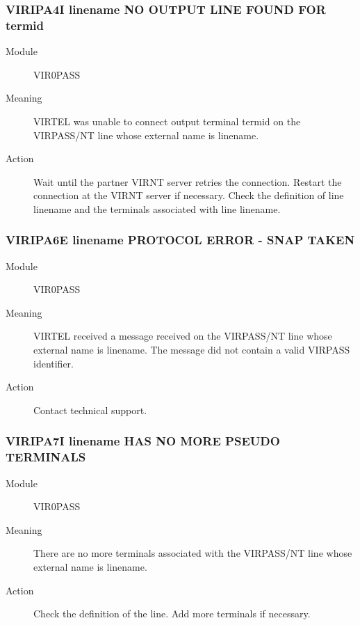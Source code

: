 \documentclass[letterpaper,10pt,english]{sphinxmanual}
\begin{document}
\subsubsection{VIRIPA4I linename NO OUTPUT LINE FOUND FOR termid}
\label{\detokenize{messages:viripa4i-linename-no-output-line-found-for-termid}}\begin{description}
\item[{Module}] \leavevmode
VIR0PASS

\item[{Meaning}] \leavevmode
VIRTEL was unable to connect output terminal termid on the VIRPASS/NT line whose external name is linename.

\item[{Action}] \leavevmode
Wait until the partner VIRNT server retries the connection. Restart the connection at the VIRNT server if necessary. Check the definition of line linename and the terminals associated with line linename.

\end{description}


\subsubsection{VIRIPA6E linename PROTOCOL ERROR - SNAP TAKEN}
\label{\detokenize{messages:viripa6e-linename-protocol-error-snap-taken}}\begin{description}
\item[{Module}] \leavevmode
VIR0PASS

\item[{Meaning}] \leavevmode
VIRTEL received a message received on the VIRPASS/NT line whose external name is linename. The message did not contain a valid VIRPASS identifier.

\item[{Action}] \leavevmode
Contact technical support.

\end{description}


\subsubsection{VIRIPA7I linename HAS NO MORE PSEUDO TERMINALS}
\label{\detokenize{messages:viripa7i-linename-has-no-more-pseudo-terminals}}\begin{description}
\item[{Module}] \leavevmode
VIR0PASS

\item[{Meaning}] \leavevmode
There are no more terminals associated with the VIRPASS/NT line whose external name is linename.

\item[{Action}] \leavevmode
Check the definition of the line. Add more terminals if necessary.

\end{description}
\end{document}
